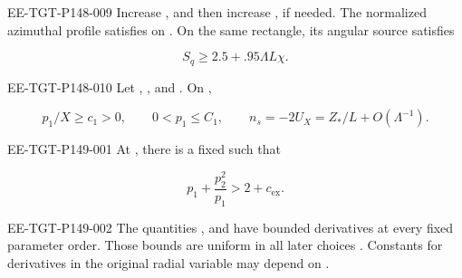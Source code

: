 \begin{proposition}\label{prop:B.3}
\begin{EESegment}{EE-TGT-P148-009}
Increase , and then increase
, if needed. The normalized azimuthal profile satisfies
 on . On the same
rectangle, its angular source satisfies
\end{EESegment}
\begin{equation}
  S_q\geq2.5+.95\Lambda L\chi.
  \tag{B.17}\label{eq:B.17}
\end{equation}
\begin{EESegment}{EE-TGT-P148-010}
Let ,
, and . On
,
\end{EESegment}
\begin{equation}
  p_1/X\geq c_1>0,
  \qquad 0<p_1\leq C_1,
  \qquad n_s=-2U_X=Z_*/L+O(\Lambda^{-1}).
  \tag{B.18}\label{eq:B.18}
\end{equation}
%
\begin{EESegment}{EE-TGT-P149-001}
At , there is a fixed
 such that
\end{EESegment}
\begin{equation}
  p_1+\frac{p_2^2}{p_1}>2+c_{\mathrm{ex}}.
  \tag{B.19}\label{eq:B.19}
\end{equation}
\begin{EESegment}{EE-TGT-P149-002}
The quantities , and
 have bounded derivatives at every fixed parameter order. Those bounds are
uniform in all later choices . Constants for
derivatives in the original radial variable  may depend on
.
\end{EESegment}
\end{proposition}

